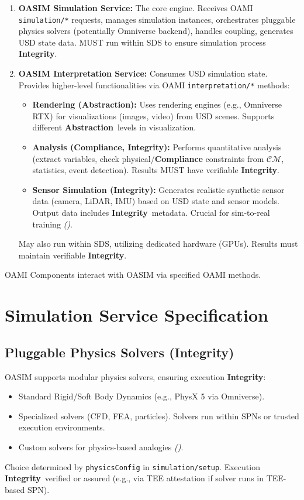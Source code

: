 \documentclass[12pt,a4paper]{report}
\renewcommand{\citep}[1]{\textit{\scriptsize{(\cite{#1})}}}
\newcommand{\Integrity}{\textbf{Integrity}}
\newcommand{\Abstraction}{\textbf{Abstraction}}
\begin{document}
	\begin{enumerate}
		\item \textbf{OASIM Simulation Service:} The core engine. Receives OAMI \texttt{simulation/*} requests, manages simulation instances, orchestrates pluggable physics solvers (potentially Omniverse backend), handles coupling, generates USD state data. MUST run within SDS to ensure simulation process \Integrity.
		\item \textbf{OASIM Interpretation Service:} Consumes USD simulation state. Provides higher-level functionalities via OAMI \texttt{interpretation/*} methods:
		\begin{itemize}
			\item \textbf{Rendering (\Abstraction):} Uses rendering engines (e.g., Omniverse RTX) for visualizations (images, video) from USD scenes. Supports different \Abstraction\ levels in visualization.
			\item \textbf{Analysis (\textbf{Compliance}, \Integrity):} Performs quantitative analysis (extract variables, check physical/\textbf{Compliance} constraints from $\mathcal{CM}$, statistics, event detection). Results MUST have verifiable \Integrity.
			\item \textbf{Sensor Simulation (\Integrity):} Generates realistic synthetic sensor data (camera, LiDAR, IMU) based on USD state and sensor models. Output data includes \Integrity\ metadata. Crucial for sim-to-real training \citep{Li2025DigitalTwins}.
		\end{itemize}
		May also run within SDS, utilizing dedicated hardware (GPUs). Results must maintain verifiable \Integrity.
	\end{enumerate}
	OAMI Components interact with OASIM via specified OAMI methods.
	
	\section{Simulation Service Specification}
	\label{app:oasim_sim_service_spec}
	
	\subsection{Pluggable Physics Solvers (\Integrity)}
	\label{app:oasim_physics_solvers}
	OASIM supports modular physics solvers, ensuring execution \Integrity:
	\begin{itemize}
		\item Standard Rigid/Soft Body Dynamics (e.g., PhysX 5 via Omniverse).
		\item Specialized solvers (CFD, FEA, particles). Solvers run within SPNs or trusted execution environments.
		\item Custom solvers for physics-based analogies \citep{Physics-InspiredReasoning_Ref14, Physics-InspiredReasoning_Ref17}.
	\end{itemize}
	Choice determined by \texttt{physicsConfig} in \texttt{simulation/setup}. Execution \Integrity\ verified or assured (e.g., via TEE attestation if solver runs in TEE-based SPN).
	
\end{document}

